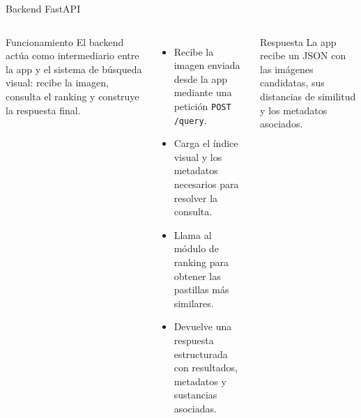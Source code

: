 \documentclass[aspectratio=169,11pt]{beamer}
\begin{document}
\begin{frame}{Backend FastAPI}
  \begin{columns}[c,onlytextwidth]

      \begin{block}{Funcionamiento}
      El backend actúa como intermediario entre la app y el sistema de búsqueda visual: recibe la imagen, consulta el ranking y construye la respuesta final.
      \end{block}

      \vspace{0.2cm}

      \begin{itemize}
        \setlength\itemsep{0.16cm}
        \item Recibe la imagen enviada desde la app mediante una petición \texttt{POST /query}.
        \item Carga el índice visual y los metadatos necesarios para resolver la consulta.
        \item Llama al módulo de ranking para obtener las pastillas más similares.
        \item Devuelve una respuesta estructurada con resultados, metadatos y sustancias asociadas.
      \end{itemize}

      \centering


      \vspace{0.25cm}

      \begin{block}{Respuesta}
      La app recibe un JSON con las imágenes candidatas, sus distancias de similitud y los metadatos asociados.
      \end{block}

  \end{columns}
\end{frame}
\end{document}
